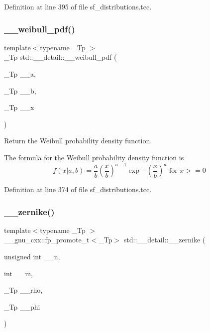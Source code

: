 Definition at line 395 of file sf\+\_\+distributions.\+tcc.

\mbox{\label{namespacestd_1_1____detail_ab15a21521bc750303938a108c5a0bb0b}} 
\subsubsection{\texorpdfstring{\+\_\+\+\_\+weibull\+\_\+pdf()}{\_\_weibull\_pdf()}}
{\footnotesize\ttfamily template$<$typename \+\_\+\+Tp $>$ \\
\+\_\+\+Tp std\+::\+\_\+\+\_\+detail\+::\+\_\+\+\_\+weibull\+\_\+pdf (\begin{DoxyParamCaption}\item[{\+\_\+\+Tp}]{\+\_\+\+\_\+a,  }\item[{\+\_\+\+Tp}]{\+\_\+\+\_\+b,  }\item[{\+\_\+\+Tp}]{\+\_\+\+\_\+x }\end{DoxyParamCaption})}



Return the Weibull probability density function. 

The formula for the Weibull probability density function is \[ f(x | a, b) = \frac{a}{b} \left(\frac{x}{b} \right)^{a-1} \exp{-\left(\frac{x}{b}\right)^a} \mbox{ for } x >= 0 \] 

Definition at line 374 of file sf\+\_\+distributions.\+tcc.

\mbox{\label{namespacestd_1_1____detail_afea4164e87d4290c59c0f8b52113b946}} 
\subsubsection{\texorpdfstring{\+\_\+\+\_\+zernike()}{\_\_zernike()}}
{\footnotesize\ttfamily template$<$typename \+\_\+\+Tp $>$ \\
\+\_\+\+\_\+gnu\+\_\+cxx\+::fp\+\_\+promote\+\_\+t$<$\+\_\+\+Tp$>$ std\+::\+\_\+\+\_\+detail\+::\+\_\+\+\_\+zernike (\begin{DoxyParamCaption}\item[{unsigned int}]{\+\_\+\+\_\+n,  }\item[{int}]{\+\_\+\+\_\+m,  }\item[{\+\_\+\+Tp}]{\+\_\+\+\_\+rho,  }\item[{\+\_\+\+Tp}]{\+\_\+\+\_\+phi }\end{DoxyParamCaption})}

